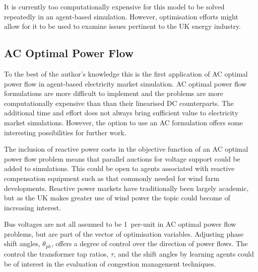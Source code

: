 It is currently too computationally expensive for this model to be solved
repeatedly in an agent-based simulation.  However, optimisation efforts might
allow for it to be used to examine issues pertinent to the UK energy industry.


\subsection{AC Optimal Power Flow}
To the best of the author's knowledge this is the first application of AC
optimal power flow in agent-based electricity market simulation.  AC optimal
power flow formulations are more difficult to implement and the problems are
more computationally expensive than than their linearised DC counterparts.  The
additional time and effort does not always bring sufficient value to
electricity market simulations.  However, the option to use an AC formulation
offers some interesting possibilities for further work.

The inclusion of reactive power costs in the objective function of an AC
optimal power flow problem means that parallel auctions for voltage support
could be added to simulations.  This could be open to agents associated with
reactive compensation equipment such as that commonly needed for wind farm
developments.  Reactive power markets have traditionally been largely
academic, but as the UK makes greater use of wind power the topic could
become of increasing interest.

Bus voltages are not all assumed to be 1~per-unit in AC optimal power flow
problems, but are part of the vector of optimisation variables.  Adjusting
phase shift angles, $\theta_{ph}$, offers a degree of control over the
direction of power flows.  The control the transformer tap ratios, $\tau$, and
the shift angles by learning agents could be of interest in the evaluation of
congestion management techniques.

